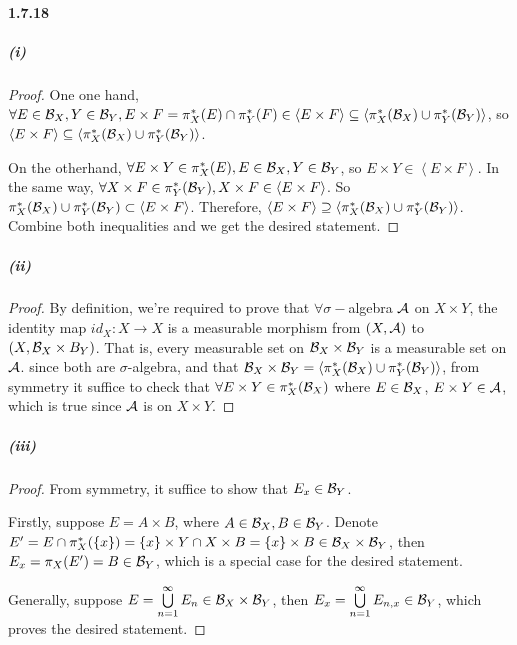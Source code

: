 \documentclass{article}
\begin{document}
\paragraph{1.7.18}
\subparagraph{(i)}
\begin{proof}
One one hand, $\forall E\in\mathcal{B}_X, Y\in\mathcal{B}_Y, E\times F=\pi^*_X(E)\cap\pi^*_Y(F)\in\left<E\times F\right>\subseteq\left<\pi^*_X(\mathcal{B}_X)\cup\pi^*_Y(\mathcal{B}_Y)\right>$, so $\left<E\times F\right>\subseteq\left<\pi^*_X(\mathcal{B}_X)\cup\pi^*_Y(\mathcal{B}_Y)\right>$.

On the otherhand, $\forall E\times Y\in\pi^*_X(E), E\in\mathcal{B}_X, Y\in\mathcal{B}_Y$, so $E\times Y\in\left<E\times F\right>$. In the same way, $\forall X\times F\in \pi^*_{Y}(\mathcal{B}_Y), X\times F\in\left<E\times F\right>$. So $\pi^*_X(\mathcal{B}_X)\cup\pi^*_Y(\mathcal{B}_Y)\subset \left<E\times F\right>$. Therefore, $\left<E\times F\right>\supseteq\left<\pi^*_X(\mathcal{B}_X)\cup\pi^*_Y(\mathcal{B}_Y)\right>$. Combine both inequalities and we get the desired statement.
\end{proof}
\subparagraph{(ii)}
\begin{proof}
By definition, we're required to prove that $\forall \sigma-$algebra $\mathcal{A}$ on $X\times Y$,  the identity map $id_X:X\to X$ is a measurable morphism from $(X,\mathcal{A})$ to $(X,\mathcal{B}_X\times B_Y)$. That is, every measurable set on $\mathcal{B}_X\times \mathcal{B}_Y$ is a measurable set on $\mathcal{A}$. since both are $\sigma$-algebra, and that $\mathcal{B}_X\times\mathcal{B}_Y=\left<\pi^*_X(\mathcal{B}_X)\cup \pi^*_Y(\mathcal{B}_Y)\right>$, from symmetry it suffice to check that $\forall E\times Y\in \pi^*_X(\mathcal{B}_X)$ where $E\in \mathcal{B}_X$, $E\times Y\in \mathcal{A}$, which is true since $\mathcal{A}$ is on $X\times Y$. 
\end{proof}
\subparagraph{(iii)}
\begin{proof}
From symmetry, it suffice to show that $E_x\in \mathcal{B}_Y$.


Firstly, suppose $E=A\times B$, where $A\in \mathcal{B}_X, B\in \mathcal{B}_Y$. 
Denote $E'=E\cap \pi^*_X(\{x\})=\{x\}\times Y\cap X\times B=\{x\}\times B\in \mathcal{B}_X\times \mathcal{B}_Y$, then $E_x=\pi_X(E')=B\in \mathcal{B}_Y$, which is a special case for the desired statement.

Generally, suppose $E=\bigcup\limits_{n=1}^\infty E_n\in \mathcal{B}_X\times \mathcal{B}_Y$, then $E_x=\bigcup\limits_{n=1}^{\infty} E_{n,x}\in \mathcal{B}_Y$, which proves the desired statement.
\end{proof}
\end{document}
